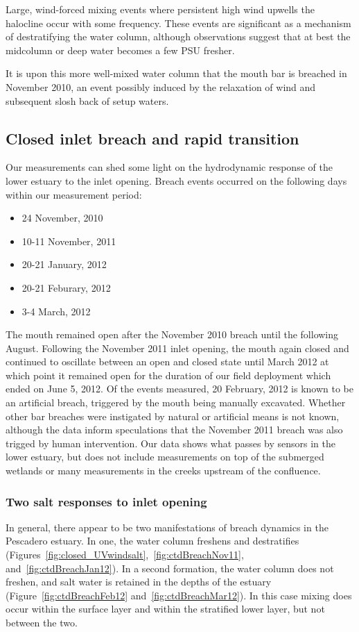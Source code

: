 Large, wind-forced mixing events where persistent high wind upwells the halocline occur with some frequency. These events are significant as a mechanism of destratifying the water column, although observations suggest that at best the midcolumn or deep water becomes a few PSU fresher. 

It is upon this more well-mixed water column that the mouth bar is breached in November 2010, an event possibly induced by the relaxation of wind and subsequent slosh back of setup waters. 

\subsection{Closed inlet breach and rapid transition} \label{breach_dynamics}
Our measurements can shed some light on the hydrodynamic response of the lower estuary to the inlet opening. Breach events occurred on the following days within our measurement period:
\begin{itemize}
	\item 24 November, 2010
	\item 10-11 November, 2011
	\item 20-21 January, 2012
	\item 20-21 Feburary, 2012
	\item 3-4 March, 2012
\end{itemize}
The mouth remained open after the November 2010 breach until the following August. Following the November 2011 inlet opening, the mouth again closed and continued to oscillate between an open and closed state until March 2012 at which point it remained open for the duration of our field deployment which ended on June 5, 2012. Of the events measured, 20 February, 2012 is known to be an artificial breach, triggered by the mouth being manually excavated. Whether other bar breaches were instigated by natural or artificial means is not known, although the data inform speculations that the November 2011 breach was also trigged by human intervention. Our data shows what passes by sensors in the lower estuary, but does not include measurements on top of the submerged wetlands or many measurements in the creeks upstream of the confluence.

\subsubsection{Two salt responses to inlet opening}
In general, there appear to be two manifestations of breach dynamics in the Pescadero estuary.  In one, the water column freshens and destratifies (Figures~\ref{fig:closed_UVwindsalt},~\ref{fig:ctdBreachNov11}, and~\ref{fig:ctdBreachJan12}). In a second formation, the water column does not freshen, and salt water is retained in the depths of the estuary (Figure~\ref{fig:ctdBreachFeb12} and~\ref{fig:ctdBreachMar12}). In this case mixing does occur within the surface layer and within the stratified lower layer, but not between the two.

